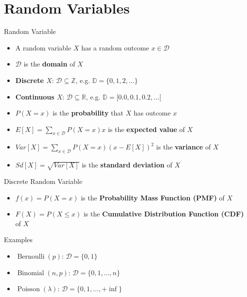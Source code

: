 \documentclass{beamer}\usepackage[]{graphicx}\usepackage[]{color}
\begin{document}
\section{Random Variables}

\begin{frame}{Random Variable}
  \begin{itemize}
    \item A random variable $X$ has a random outcome $x \in \mathcal{D}$
    \item $\mathcal{D}$ is the \textbf{domain} of $X$
    \item \textbf{Discrete $X$}: $\mathcal{D} \subseteq \mathbb{Z}$, e.g. $\mathbb{D}=\{0, 1, 2, \dots\}$
    \item \textbf{Continuous $X$}: $\mathcal{D} \subseteq \mathbb{R}$, e.g. $\mathbb{D}=[0.0, 0.1, 0.2, \dots[$
    \item $P(X=x)$ is the \textbf{probability} that $X$ has outcome $x$
    \item $E[X]=\sum_{x \in \mathcal{D}} P(X=x) x$ is the \textbf{expected value} of $X$
    \item $Var[X]=\sum_{x \in \mathcal{D}} P(X=x) (x - E[X])^2$ is the \textbf{variance} of $X$
    \item $Sd[X]=\sqrt{Var[X]}$ is the \textbf{standard deviation} of $X$
  \end{itemize}
\end{frame}

\begin{frame}{Discrete Random Variable}
  \begin{itemize}
    \item $f(x) = P(X=x)$ is the \textbf{Probability Mass Function (PMF)} of $X$
    \item $F(X) = P(X\le x)$ is the \textbf{Cumulative Distribution Function (CDF)} of $X$
  \end{itemize}
  \begin{exampleblock}{Examples}
    \begin{itemize}
      \item $\operatorname{Bernoulli}(p)$: $\mathcal{D} = \{0, 1\}$
      \item $\operatorname{Binomial}(n, p)$: $\mathcal{D} = \{0, 1, \dots, n\}$
      \item $\operatorname{Poisson}(\lambda)$: $\mathcal{D} = \{0, 1, \dots, +\inf\}$
    \end{itemize}
  \end{exampleblock}
\end{frame}
\end{document}

